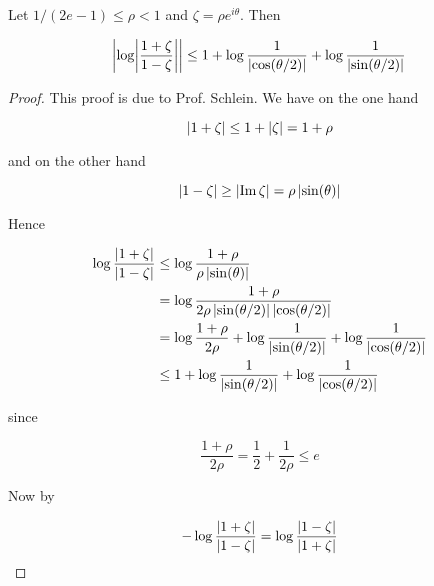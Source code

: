 \begin{lemma}
	Let $1/(2e - 1) \leq \rho < 1$ and $\zeta = \rho e^{i\theta}$. Then

	\begin{equation*}
		\abs[3]{ \log \abs{ \frac{1 + \zeta}{1 - \zeta}}} \leq 1 + \log \frac{1}{\abs[0]{ \cos(\theta/2)}} + \log \frac{1}{\abs[0]{ \sin(\theta/2)}}
	\end{equation*}
	\label{lem:upper_bound}
\end{lemma}

\begin{proof}
	This proof is due to Prof. Schlein. We have on the one hand

	\begin{equation*}
		\abs[0]{ 1 + \zeta} \leq 1 + \abs[0]{ \zeta} = 1 + \rho
	\end{equation*}

	\noindent and on the other hand

	\begin{equation*}
		\abs[0]{ 1 - \zeta } \geq \abs[0]{\Im\zeta} = \rho\abs[0]{\sin(\theta)}
	\end{equation*}

	Hence
	
	\begin{gather*}
		\begin{aligned}
			\log \frac{\abs[0]{ 1 + \zeta}}{\abs[0]{ 1 - \zeta }} &\leq \log\frac{1 + \rho}{\rho \abs[0]{ \sin(\theta)}}\\
			&=  \log\frac{1 + \rho}{2\rho \abs[0]{ \sin(\theta/2)}\abs[0]{ \cos(\theta/2)}}\\
			&=  \log\frac{1 + \rho}{2\rho}  +  \log \frac{1}{\abs[0]{ \sin(\theta/2)}} +  \log\frac{1}{\abs[0]{ \cos(\theta/2)}}\\
			&\leq  1 + \log \frac{1}{\abs[0]{ \sin(\theta/2)}} + \log \frac{1}{\abs[0]{ \cos(\theta/2)}}	
		\end{aligned}
	\end{gather*}

	\noindent since

	\begin{equation*}
		\frac{1 + \rho}{2\rho} = \frac{1}{2} + \frac{1}{2\rho} \leq e
	\end{equation*}

	Now by

	\begin{equation*}
		-\log \frac{\abs[0]{ 1 + \zeta }}{\abs[0]{ 1 - \zeta }}  = 	\log \frac{\abs[0]{ 1 - \zeta }}{\abs[0]{ 1 + \zeta }} 
	\end{equation*}


\end{proof}
